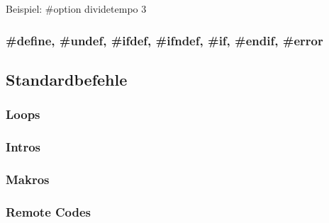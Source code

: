 Beispiel: \#option dividetempo 3


\subsubsection*{\#define, \#undef, \#ifdef, \#ifndef, \#if, \#endif, \#error}

\subsection{Standardbefehle}
\subsubsection{Loops}
\subsubsection{Intros}
\subsubsection{Makros}
\subsubsection{Remote Codes}